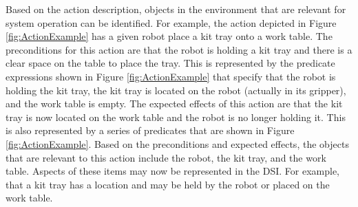Based on the action description, objects in the environment that are relevant 
for system operation can be identified. For example, the action depicted in Figure \ref{fig:ActionExample}
has a given robot place a kit tray onto a work table. The preconditions for this action are that
the robot is holding a kit tray and there is a clear space on the table to place the tray. This is
represented by the predicate expressions shown in Figure \ref{fig:ActionExample} that specify that
the robot is holding the kit tray, the kit tray is located on the robot (actually in its gripper), and
the work table is empty. The expected effects of this action are that the kit tray is now located
on the work table and the robot is no longer holding it. This is also represented by a series
of predicates that are shown in Figure \ref{fig:ActionExample}. Based on the preconditions and expected effects,
the objects that are relevant to this action include the robot, the kit tray, and the work table.
Aspects of these items may now be represented in the DSI. For example, that a kit tray has a location and may
be held by the robot or placed on the work table.

